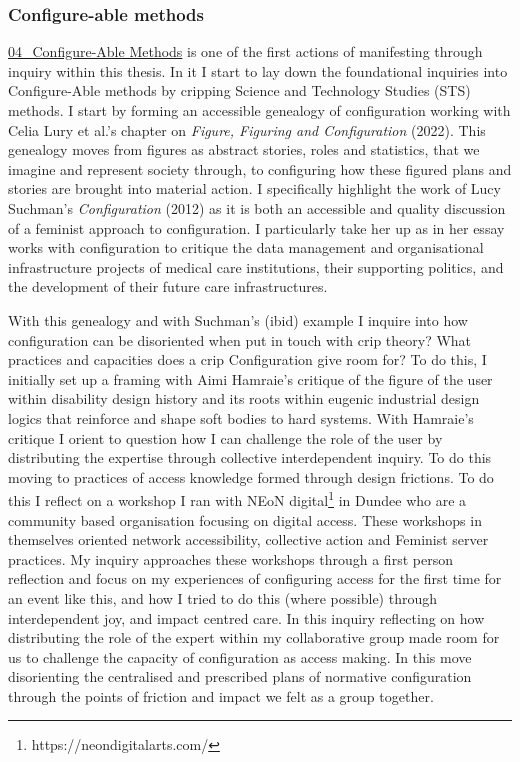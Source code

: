 \hypertarget{configure-able-methods}{%
\subsubsection[Configure-able
methods]{\texorpdfstring{\protect\hypertarget{anchor}{}{}Configure-able
methods}{Configure-able methods}}\label{configure-able-methods}}

\href{../../04_Configure-able_Methods/04_Configure-Able\%20Methods.md}{04\_Configure-Able
Methods} is one of the first actions of manifesting through inquiry
within this thesis. In it I start to lay down the foundational inquiries
into Configure-Able methods by cripping Science and Technology Studies
(STS) methods. I start by forming an accessible genealogy of
configuration working with Celia Lury et al.'s chapter on \emph{Figure,
Figuring and Configuration} (2022). This genealogy moves from figures as
abstract stories, roles and statistics, that we imagine and represent
society through, to configuring how these figured plans and stories are
brought into material action. I specifically highlight the work of Lucy
Suchman's \emph{Configuration} (2012) as it is both an accessible and
quality discussion of a feminist approach to configuration. I
particularly take her up as in her essay works with configuration to
critique the data management and organisational infrastructure projects
of medical care institutions, their supporting politics, and the
development of their future care infrastructures.

With this genealogy and with Suchman's (ibid) example I inquire into how
configuration can be disoriented when put in touch with crip theory?
What practices and capacities does a crip Configuration give room for?
To do this, I initially set up a framing with Aimi Hamraie's critique of
the figure of the user within disability design history and its roots
within eugenic industrial design logics that reinforce and shape soft
bodies to hard systems. With Hamraie's critique I orient to question how
I can challenge the role of the user by distributing the expertise
through collective interdependent inquiry. To do this moving to
practices of access knowledge formed through design frictions. To do
this I reflect on a workshop I ran with NEoN digital\footnote{https://neondigitalarts.com/}
in Dundee who are a community based organisation focusing on digital
access. These workshops in themselves oriented network accessibility,
collective action and Feminist server practices. My inquiry approaches
these workshops through a first person reflection and focus on my
experiences of configuring access for the first time for an event like
this, and how I tried to do this (where possible) through interdependent
joy, and impact centred care. In this inquiry reflecting on how
distributing the role of the expert within my collaborative group made
room for us to challenge the capacity of configuration as access making.
In this move disorienting the centralised and prescribed plans of
normative configuration through the points of friction and impact we
felt as a group together.

